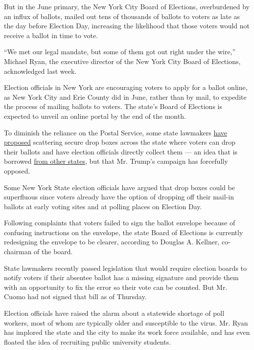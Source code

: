 But in the June primary, the New York City Board of Elections,
overburdened by an influx of ballots, mailed out tens of thousands of
ballots to voters as late as the day before Election Day, increasing the
likelihood that those voters would not receive a ballot in time to vote.

``We met our legal mandate, but some of them got out right under the
wire,'' Michael Ryan, the executive director of the New York City Board
of Elections, acknowledged last week.

Election officials in New York are encouraging voters to apply for a
ballot online, as New York City and Erie County did in June, rather than
by mail, to expedite the process of mailing ballots to voters. The
state's Board of Elections is expected to unveil an online portal by the
end of the month.

To diminish the reliance on the Postal Service, some state lawmakers
\href{https://www.nysenate.gov/legislation/bills/2019/s8902}{have
proposed} scattering secure drop boxes across the state where voters can
drop their ballots and have election officials directly collect them ---
an idea that is borrowed
\href{https://www.nytimes3xbfgragh.onion/2020/08/17/us/politics/postal-service-voting.html}{from
other states}, but that Mr. Trump's campaign has forcefully opposed.

Some New York State election officials have argued that drop boxes could
be superfluous since voters already have the option of dropping off
their mail-in ballots at early voting sites and at polling places on
Election Day.

Following complaints that voters failed to sign the ballot envelope
because of confusing instructions on the envelope, the state Board of
Elections is currently redesigning the envelope to be clearer, according
to Douglas A. Kellner, co-chairman of the board.

State lawmakers recently passed legislation that would require election
boards to notify voters if their absentee ballot has a missing signature
and provide them with an opportunity to fix the error so their vote can
be counted. But Mr. Cuomo had not signed that bill as of Thursday.

Election officials have raised the alarm about a statewide shortage of
poll workers, most of whom are typically older and susceptible to the
virus. Mr. Ryan has implored the state and the city to make its work
force available, and has even floated the idea of recruiting public
university students.


